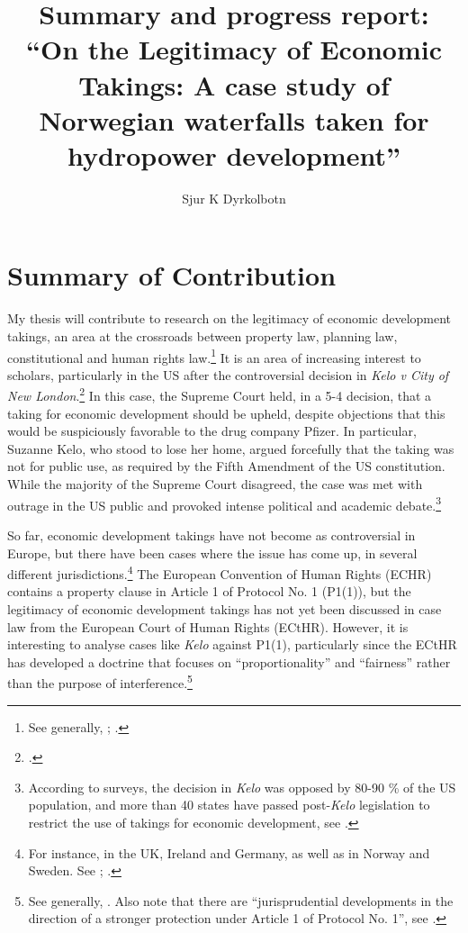 \documentclass[12pt,a4paper]{article} %
\title{{\huge Summary and progress report:} \\ ``On the Legitimacy of Economic Takings: A case study of Norwegian waterfalls taken for hydropower development''}
\author{Sjur K Dyrkolbotn}
\date{} %
\begin{document}
\maketitle

\section*{Summary of Contribution}

My thesis will contribute to research on the legitimacy of economic development takings, an area at the crossroads between property law, planning law, constitutional and human rights law.\footnote{See generally, \cite[Chapter 12]{epstein85};  \cite{merrill86,malloy08}.} It is an area of increasing interest to scholars, particularly in the US after the controversial decision in {\it Kelo v City of New London}.\footcite{kelo05} In this case, the Supreme Court held, in a 5-4 decision, that a taking for economic development should be upheld, despite objections that this would be suspiciously favorable to the drug company Pfizer. In particular, Suzanne Kelo, who stood to lose her home, argued forcefully that the taking was not for public use, as required by the Fifth Amendment of the US constitution. While the majority of the Supreme Court disagreed, the case was met with outrage in the US public and provoked intense political and academic debate.\footnote{According to surveys, the decision in {\it Kelo} was opposed by 80-90 \% of the US population, and more than 40 states have passed post-{\it Kelo} legislation to restrict the use of takings for economic development, see \cite{somin09}.}

So far, economic development takings have not become as controversial in Europe, but there have been cases where the issue has come up, in several different jurisdictions.\footnote{For instance, in the UK, Ireland and Germany, as well as in Norway and Sweden. See \cite[466-483]{walt11}; \cite{stenseth10}.} The European Convention of Human Rights (ECHR) contains a property clause in Article 1 of Protocol No. 1 (P1(1)), but the legitimacy of economic development takings has not yet been discussed in case law from the European Court of Human Rights (ECtHR). However, it is interesting to analyse cases like {\it Kelo} against P1(1), particularly since the ECtHR has developed a doctrine that focuses on ``proportionality'' and ``fairness'' rather than the purpose of interference.\footnote{See generally, \cite[Chapter 5]{allen05}. Also note that there are ``jurisprudential developments in the direction of a stronger protection under Article 1 of Protocol No. 1'', see \cite[135]{lindheim12}.}
\end{document}
